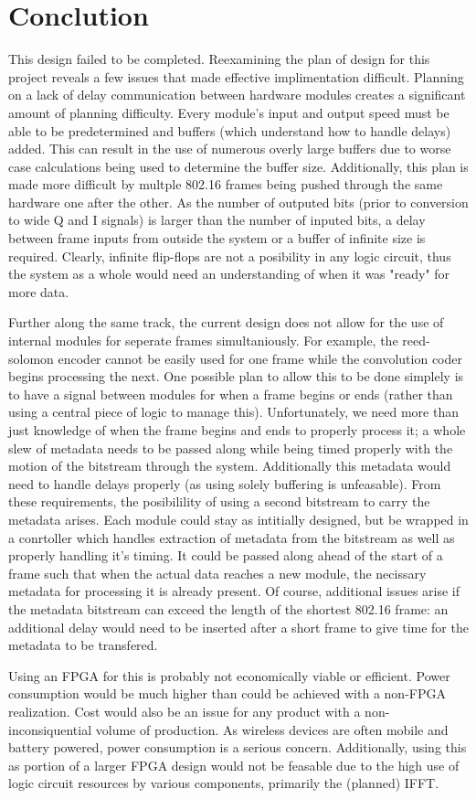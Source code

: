 \section{Conclution}

This design failed to be completed. Reexamining the plan of design for this project reveals a few issues that made effective implimentation difficult. Planning on a lack of delay communication between hardware modules creates a significant amount of planning difficulty. Every module's input and output speed must be able to be predetermined and buffers (which understand how to handle delays) added. This can result in the use of numerous overly large buffers due to worse case calculations being used to determine the buffer size. Additionally, this plan is made more difficult by multple 802.16 frames being pushed through the same hardware one after the other. As the number of outputed bits (prior to conversion to wide Q and I signals) is larger than the number of inputed bits, a delay between frame inputs from outside the system or a buffer of infinite size is required. Clearly, infinite flip-flops are not a posibility in any logic circuit, thus the system as a whole would need an understanding of when it was "ready" for more data.

Further along the same track, the current design does not allow for the use of internal modules for seperate frames simultaniously. For example, the reed-solomon encoder cannot be easily used for one frame while the convolution coder begins processing the next. One possible plan to allow this to be done simplely is to have a signal between modules for when a frame begins or ends (rather than using a central piece of logic to manage this). Unfortunately, we need more than just knowledge of when the frame begins and ends to properly process it; a whole slew of metadata needs to be passed along while being timed properly with the motion of the bitstream through the system. Additionally this metadata would need to handle delays properly (as using solely buffering is unfeasable). From these requirements, the posibilility of using a second bitstream to carry the metadata arises. Each module could stay as intitially designed, but be wrapped in a conrtoller which handles extraction of metadata from the bitstream as well as properly handling it's timing. It could be passed along ahead of the start of a frame such that when the actual data reaches a new module, the necissary metadata for processing it is already present. Of course, additional issues arise if the metadata bitstream can exceed the length of the shortest 802.16 frame: an additional delay would need to be inserted after a short frame to give time for the metadata to be transfered.

Using an FPGA for this is probably not economically viable or efficient. Power consumption would be much higher than could be achieved with a non-FPGA realization. Cost would also be an issue for any product with a non-inconsiquential volume of production. As wireless devices are often  mobile and battery powered, power consumption is a serious concern. Additionally, using this as portion of a larger FPGA design would not be feasable due to the high use of logic circuit resources by various components, primarily the (planned) IFFT.